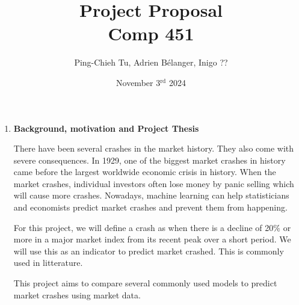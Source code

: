 \documentclass[12pt, letterpaper]{article}
\title{
  Project Proposal \\
  \Large Comp 451}
\author{Ping-Chieh Tu, Adrien Bélanger, Inigo ??}
\date{November 3$^{\text{rd}}$ 2024}
\begin{document}
\maketitle 

\begin{enumerate}
    \item [] \textbf{Background, motivation and Project Thesis}

    There have been several crashes in the market history. They also come with severe consequences. In 1929, one of the biggest market crashes in history came before the largest worldwide economic crisis in history. When the market crashes, individual investors often lose money by panic selling which will cause more crashes. Nowadays, machine learning can help statisticians and economists predict market crashes and prevent them from happening.

    For this project, we will define a crash as when there is a decline of 20$\%$ or more in a major market index from its recent peak over a short period. We will use this as an indicator to predict market crashed. This is commonly used in litterature.
    
   


    This project aims to compare several commonly used models to predict market crashes using market data.
    

\end{enumerate}
\end{document}
